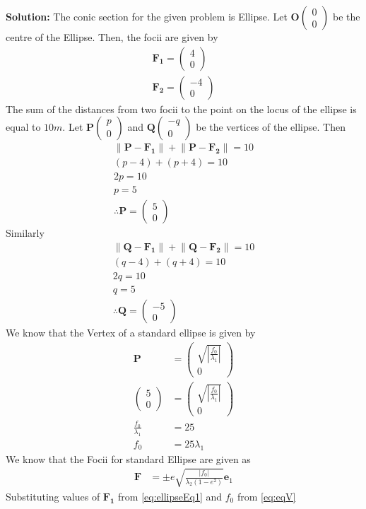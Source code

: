 \documentclass[12pt]{article}
\providecommand{\brak}[1]{\ensuremath{\left(#1\right)}}
\providecommand{\norm}[1]{\left\lVert#1\right\rVert}
\providecommand{\abs}[1]{\left\vert#1\right\vert}
\newcommand{\solution}{\noindent \textbf{Solution: }}
\newcommand{\myvec}[1]{\ensuremath{\begin{pmatrix}#1\end{pmatrix}}}
\let\vec\mathbf
\begin{document}
\begin{enumerate}
\solution 
The conic section for the given problem is Ellipse. Let $\vec{O}\myvec{0 \\ 0}$ be the centre of the Ellipse. Then, the focii are given by 
\begin{align}
    \label{eq:ellipseEq1}
	\vec{F_1} = \myvec{ 4 \\ 0} \\
	\vec{F_2} = \myvec{ -4 \\ 0} 
\end{align}
The sum of the distances from two focii to the point on the locus of the ellipse is equal to $10m$. Let $\vec{P}\myvec{p \\ 0 }$ and $\vec{Q}\myvec{-q \\ 0}$ be the vertices of the ellipse. Then
\begin{align}
	\norm{\vec{P}-\vec{F_1}} + \norm{\vec{P}-\vec{F_2}} = 10 \\
         \brak{p-4} + \brak{p+4} = 10 \\
	 2p = 10 \\
	 p = 5  \\
	 \therefore \vec{P} = \myvec{5 \\ 0}
\end{align}
Similarly
\begin{align}
	\norm{\vec{Q}-\vec{F_1}} + \norm{\vec{Q}-\vec{F_2}} = 10 \\
         \brak{q-4} + \brak{q+4} = 10 \\
	 2q = 10 \\
	 q = 5 \\
	 \therefore \vec{Q} = \myvec{-5 \\ 0}
\end{align}
We know that the Vertex of a standard ellipse is given by
\begin{align}
	\vec{P} &=  \myvec{\sqrt{\abs{\frac{f_0}{\lambda_1}}} \\ 0} \\
	\myvec{5 \\ 0} &=  \myvec{\sqrt{\abs{\frac{f_0}{\lambda_1}}} \\ 0} \\
	\frac{f_0}{\lambda_1} &= 25 \\
	\label{eq:eqV}
	f_0 &= 25\lambda_1 
\end{align}
We know that the Focii for standard Ellipse are given as
\begin{align}
	\label{eq:eqV1}
	\vec{F} &= \pm e\sqrt{\frac{\abs{f_0}}{\lambda_2\brak{1-e^2}}}\vec{e}_1
\end{align}
Substituting values of $\vec{F_1}$ from \eqref{eq:ellipseEq1} and $f_0$ from \eqref{eq:eqV}

\end{enumerate}
\end{document}
